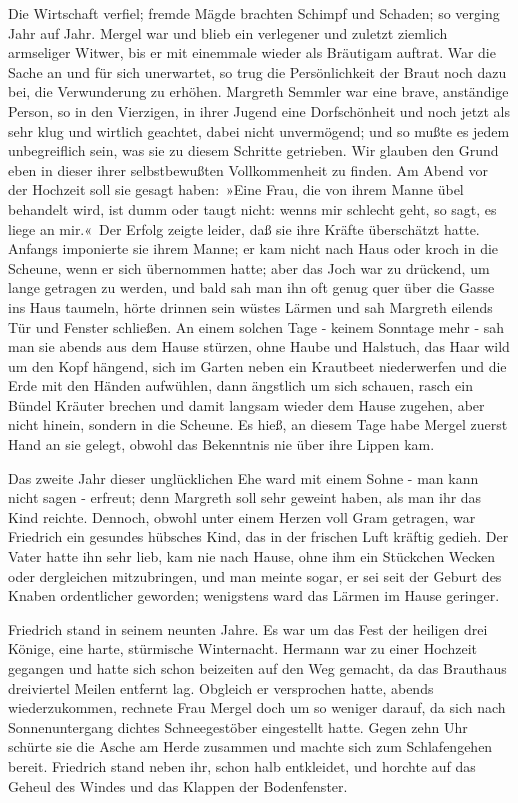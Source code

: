 Die Wirtschaft verfiel; fremde Mägde brachten Schimpf und Schaden; so verging Jahr auf Jahr. Mergel war und blieb ein verlegener und zuletzt ziemlich armseliger Witwer, bis er mit einemmale wieder als Bräutigam auftrat. War die Sache an und für sich unerwartet, so trug die Persönlichkeit der Braut noch dazu bei, die Verwunderung zu erhöhen. Margreth Semmler war eine brave, anständige Person, so in den Vierzigen, in ihrer Jugend eine Dorfschönheit und noch jetzt als sehr klug und wirtlich geachtet, dabei nicht unvermögend; und so mußte es jedem unbegreiflich sein, was sie zu diesem Schritte getrieben. Wir glauben den Grund eben in dieser ihrer selbstbewußten Vollkommenheit zu finden. Am Abend vor der Hochzeit soll sie gesagt haben: »Eine Frau, die von ihrem Manne übel behandelt wird, ist dumm oder taugt nicht: wenns mir schlecht geht, so sagt, es liege an mir.« Der Erfolg zeigte leider, daß sie ihre Kräfte überschätzt hatte. Anfangs imponierte sie ihrem Manne; er kam nicht nach Haus oder kroch in die Scheune, wenn er sich übernommen hatte; aber das Joch war zu drückend, um lange getragen zu werden, und bald sah man ihn oft genug quer über die Gasse ins Haus taumeln, hörte drinnen sein wüstes Lärmen und sah Margreth eilends Tür und Fenster schließen. An einem solchen Tage - keinem Sonntage mehr - sah man sie abends aus dem Hause stürzen, ohne Haube und Halstuch, das Haar wild um den Kopf hängend, sich im Garten neben ein Krautbeet niederwerfen und die Erde mit den Händen aufwühlen, dann ängstlich um sich schauen, rasch ein Bündel Kräuter brechen und damit langsam wieder dem Hause zugehen, aber nicht hinein, sondern in die Scheune. Es hieß, an diesem Tage habe Mergel zuerst Hand an sie gelegt, obwohl das Bekenntnis nie über ihre Lippen kam.

Das zweite Jahr dieser unglücklichen Ehe ward mit einem Sohne - man kann nicht sagen - erfreut; denn Margreth soll sehr geweint haben, als man ihr das Kind reichte. Dennoch, obwohl unter einem Herzen voll Gram getragen, war Friedrich ein gesundes hübsches Kind, das in der frischen Luft kräftig gedieh. Der Vater hatte ihn sehr lieb, kam nie nach Hause, ohne ihm ein Stückchen Wecken oder dergleichen mitzubringen, und man meinte sogar, er sei seit der Geburt des Knaben ordentlicher geworden; wenigstens ward das Lärmen im Hause geringer.

Friedrich stand in seinem neunten Jahre. Es war um das Fest der heiligen drei Könige, eine harte, stürmische Winternacht. Hermann war zu einer Hochzeit gegangen und hatte sich schon beizeiten auf den Weg gemacht, da das Brauthaus dreiviertel Meilen entfernt lag. Obgleich er versprochen hatte, abends wiederzukommen, rechnete Frau Mergel doch um so weniger darauf, da sich nach Sonnenuntergang dichtes Schneegestöber eingestellt hatte. Gegen zehn Uhr schürte sie die Asche am Herde zusammen und machte sich zum Schlafengehen bereit. Friedrich stand neben ihr, schon halb entkleidet, und horchte auf das Geheul des Windes und das Klappen der Bodenfenster.

